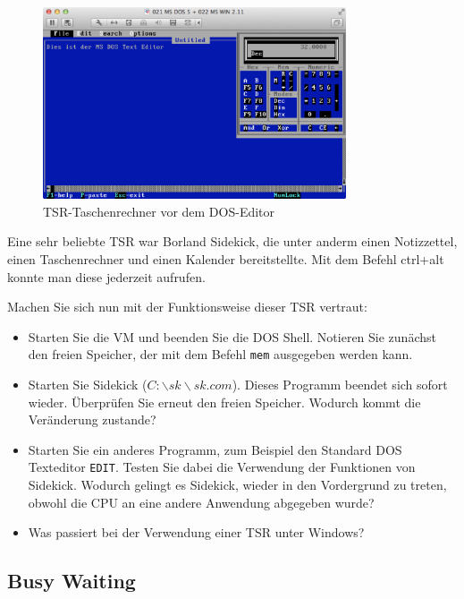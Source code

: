 	\begin{figure}[h]
		\begin{center}
			\includegraphics[width=0.8\textwidth]{img/dostsr}
			\caption{TSR-Taschenrechner vor dem DOS-Editor}
			\label{fig:screenshot-dostsr}
		\end{center}
	\end{figure}

	Eine sehr beliebte TSR war Borland Sidekick, die unter anderm einen Notizzettel, einen Taschenrechner und einen Kalender bereitstellte. Mit dem Befehl ctrl+alt konnte man diese jederzeit aufrufen.

	Machen Sie sich nun mit der Funktionsweise dieser TSR vertraut:
	
		\begin{itemize}
			\item Starten Sie die VM und beenden Sie die DOS Shell. Notieren Sie zunächst den freien Speicher, der mit dem Befehl \texttt{mem} ausgegeben werden kann.
			\item Starten Sie Sidekick (\texttt{$C:\backslash{}sk\backslash{}sk.com$}). Dieses Programm beendet sich sofort wieder. Überprüfen Sie erneut den freien Speicher. Wodurch kommt die Veränderung zustande?
			\item Starten Sie ein anderes Programm, zum Beispiel den Standard DOS Texteditor \texttt{EDIT}. Testen Sie dabei die Verwendung der Funktionen von Sidekick. Wodurch gelingt es Sidekick, wieder in den Vordergrund zu treten, obwohl die CPU an eine andere Anwendung abgegeben wurde?
			\item Was passiert bei der Verwendung einer TSR unter Windows?
		\end{itemize}
	  

	\subsection{Busy Waiting}

